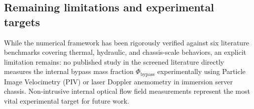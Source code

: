 \subsection{Remaining limitations and experimental targets}
\label{sec:disc_limitations}

While the numerical framework has been rigorously verified against six literature benchmarks covering thermal, hydraulic, and chassis-scale behaviors, an explicit limitation remains: no published study in the screened literature directly measures the internal bypass mass fraction $\Phi_{\mathrm{bypass}}$ experimentally using Particle Image Velocimetry (PIV) or laser Doppler anemometry in immersion server chassis. Non-intrusive internal optical flow field measurements represent the most vital experimental target for future work.

